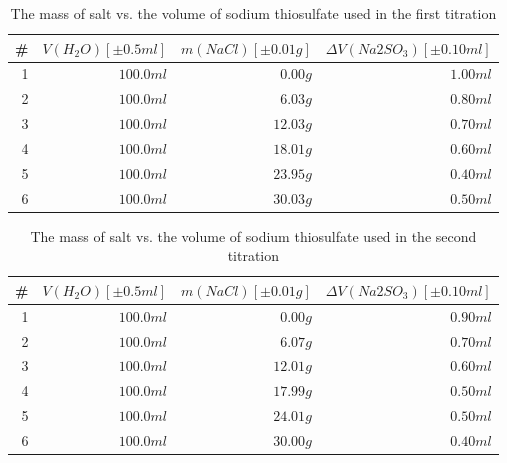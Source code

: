 \documentclass[a4paper]{article}
\begin{document}
\begin{table}[ht]
  \center
  \begin{tabular}{ r | r | r | r }
    \# & $V(H_2O) \left[ \pm 0.5 \si{ml} \right]$ & $m(NaCl) \left[ \pm 0.01
      \si{g} \right]$ & $\Delta V(Na2SO_3) \left[ \pm 0.10 \si{ml} \right]$ \\
      \hline \hline
    1 & $100.0 \si{ml}$ & $0.00 \si{g}$ & $1.00 \si{ml}$ \\ \hline
    2 & $100.0 \si{ml}$ & $6.03 \si{g}$ & $0.80 \si{ml}$ \\ \hline
    3 & $100.0 \si{ml}$ & $12.03 \si{g}$ & $0.70 \si{ml}$ \\ \hline
    4 & $100.0 \si{ml}$ & $18.01 \si{g}$ & $0.60 \si{ml}$ \\ \hline
    5 & $100.0 \si{ml}$ & $23.95 \si{g}$ & $0.40 \si{ml}$ \\ \hline
    6 & $100.0 \si{ml}$ & $30.03 \si{g}$ & $0.50 \si{ml}$ \\ \hline
  \end{tabular}
  \caption{The mass of salt vs. the volume of sodium thiosulfate used in the
    first titration \label{tbl:calc-titration-1}}
\end{table}

\begin{table}[ht]
  \center
  \begin{tabular}{ r | r | r | r }
    \# & $V(H_2O) \left[ \pm 0.5 \si{ml} \right]$ & $m(NaCl) \left[ \pm 0.01
      \si{g} \right]$ & $\Delta V(Na2SO_3) \left[ \pm 0.10 \si{ml} \right]$ \\
      \hline \hline
    1 & $100.0 \si{ml}$ & $0.00 \si{g}$ & $0.90 \si{ml}$ \\ \hline
    2 & $100.0 \si{ml}$ & $6.07 \si{g}$ & $0.70 \si{ml}$ \\ \hline
    3 & $100.0 \si{ml}$ & $12.01 \si{g}$ & $0.60 \si{ml}$ \\ \hline
    4 & $100.0 \si{ml}$ & $17.99 \si{g}$ & $0.50 \si{ml}$ \\ \hline
    5 & $100.0 \si{ml}$ & $24.01 \si{g}$ & $0.50 \si{ml}$ \\ \hline
    6 & $100.0 \si{ml}$ & $30.00 \si{g}$ & $0.40 \si{ml}$ \\ \hline
  \end{tabular}
  \caption{The mass of salt vs. the volume of sodium thiosulfate used in the
    second titration \label{tbl:calc-titration-2}}
\end{table}
\end{document}
